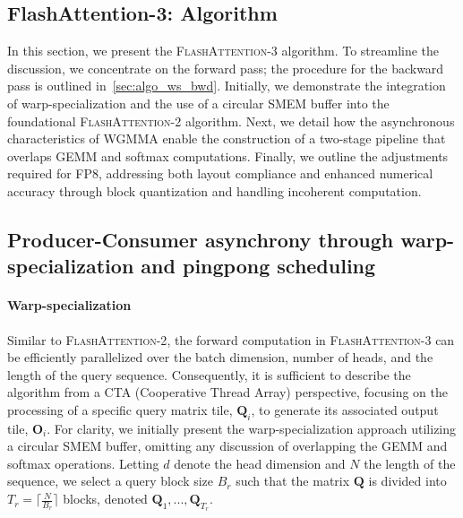 \begin{enumerate}
\section{FlashAttention-3: Algorithm}
\label{sec:algo}

In this section, we present the \textsc{FlashAttention-3} algorithm. To streamline the discussion, we concentrate on the forward pass; the procedure for the backward pass is outlined in~\cref{sec:algo_ws_bwd}. Initially, we demonstrate the integration of warp-specialization and the use of a circular SMEM buffer into the foundational \textsc{FlashAttention-2} algorithm. Next, we detail how the asynchronous characteristics of WGMMA enable the construction of a two-stage pipeline that overlaps GEMM and softmax computations. Finally, we outline the adjustments required for FP8, addressing both layout compliance and enhanced numerical accuracy through block quantization and handling incoherent computation.

\subsection{Producer-Consumer asynchrony through warp-specialization and pingpong scheduling}
\label{sec:algo_ws}

\paragraph{Warp-specialization}
Similar to \textsc{FlashAttention-2}, the forward computation in \textsc{FlashAttention-3} can be efficiently parallelized over the batch dimension, number of heads, and the length of the query sequence. Consequently, it is sufficient to describe the algorithm from a CTA (Cooperative Thread Array) perspective, focusing on the processing of a specific query matrix tile, $\mathbf{Q}_i$, to generate its associated output tile, $\mathbf{O}_i$. For clarity, we initially present the warp-specialization approach utilizing a circular SMEM buffer, omitting any discussion of overlapping the GEMM and softmax operations. Letting $d$ denote the head dimension and $N$ the length of the sequence, we select a query block size $B_r$ such that the matrix $\mathbf{Q}$ is divided into $T_r = \lceil \frac{N}{B_r} \rceil$ blocks, denoted $\mathbf{Q}_1, ..., \mathbf{Q}_{T_r}$.


\end{enumerate}
